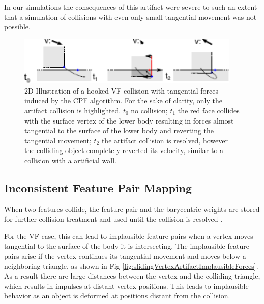 In our simulations the consequences of this artifact were severe to such an extent that a simulation of collisions with even only small tangential movement was not possible.
\begin{figure}[h] 
  \centering
     \includegraphics[width=0.95\textwidth]{pics/pdf/slidingVertexArtifactDiscretizationForces.pdf}
  \caption[2D-Illustration of a hooked VF collision with tangential forces induced by the CPF algorithm.]{2D-Illustration of a hooked VF collision with tangential forces induced by the CPF algorithm. For the sake of clarity, only the artifact collision is highlighted.  $t_0$ no collision; $t_1$ the red face collides with the surface vertex of the lower body resulting in forces almost tangential to the surface of the lower body and reverting the tangential movement; $t_2$ the artifact collision is resolved, however the colliding object completely reverted its velocity, similar to a collision with a artificial wall.}
  \label{fig:slidingVertexArtifactDiscretizationForces}
  

\end{figure}


\subsection{Inconsistent Feature Pair Mapping}
\label{ss:ImplausibleFeaturePairs}
When two features collide, the feature pair and the barycentric weights are stored for further collision treatment and used until the collision is resolved \cite{TANG2012}.

 For the VF case, this can lead to implausible feature pairs when a vertex moves tangential to the surface of the body it is intersecting.
The implausible feature pairs arise if the vertex continues its tangential movement and moves below a neighboring triangle, as shown in Fig \ref{fig:slidingVertexArtifactImplausibleForces}. As a result there are large distances between the vertex and the colliding triangle, which results in impulses at distant vertex positions. This leads to implausible behavior as an object is deformed at positions distant from the collision.

